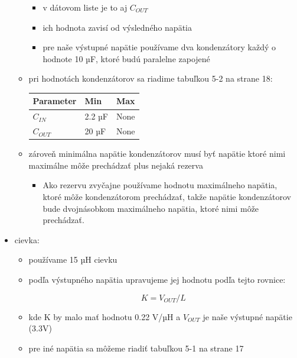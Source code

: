 \begin{itemize}
\begin{itemize}
    \begin{itemize}
    
    \item
      v dátovom liste je to aj $C_{OUT}$
    \item
      ich hodnota zavisí od výsledného napätia
    \item
      pre naše výstupné napätie používame dva kondenzátory každý o
      hodnote 10 µF, ktoré budú paralelne zapojené
    \end{itemize}
  \item
    pri hodnotách kondenzátorov sa riadime tabuľkou 5-2 na strane 18:

    \begin{longtable}[]{@{}lll@{}}
    \toprule\noalign{}
    Parameter & Min & Max \\
    \midrule\noalign{}
    \endhead
    \bottomrule\noalign{}
    \endlastfoot
    $C_{IN}$ & 2.2 µF & None \\
    $C_{OUT}$ & 20 µF & None \\
    \end{longtable}
  \item
    zároveň minimálna napätie kondenzátorov musí byť napätie ktoré nimi
    maximálne môže prechádzať plus nejaká rezerva

    \begin{itemize}
    
    \item
      Ako rezervu zvyčajne používame hodnotu maximálneho napätia, ktoré môže kondenzátorom prechádzať, takže napätie kondenzátorov bude dvojnásobkom maximálneho napätia, ktoré nimi môže prechádzať.
    \end{itemize}
  \end{itemize}
\item
  cievka:

  \begin{itemize}
  \item
    používame 15 µH cievku
  \item
    podľa výstupného napätia upravujeme jej hodnotu podľa tejto rovnice:

    \[K = V_{OUT}/L\]
  \item
    kde K by malo mať hodnotu 0.22 V/µH a $V_{OUT}$ je naše výstupné napätie
    (3.3V)
  \item
    pre iné napätia sa môžeme riadiť tabuľkou 5-1 na strane 17


\end{itemize}
\end{itemize}
